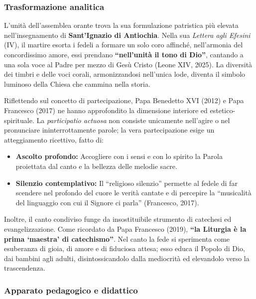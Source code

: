 \documentclass[12pt,a4paper]{article}
\begin{document}
	\subsubsection{Trasformazione analitica}\label{trasformazione-analitica-4}
	
	L'unità dell'assemblea orante trova la sua formulazione patristica più elevata nell'insegnamento di \textbf{Sant'Ignazio di Antiochia}. Nella sua \emph{Lettera agli Efesini} (IV), il martire esorta i fedeli a formare un solo coro affinché, nell'armonia del concordissimo amore, essi prendano \textbf{``nell'unità il tono di Dio''}, cantando a una sola voce al Padre per mezzo di Gesù Cristo (Leone XIV, 2025). La diversità dei timbri e delle voci corali, armonizzandosi nell'unica lode, diventa il simbolo luminoso della Chiesa che cammina nella storia.
	
	Riflettendo sul concetto di partecipazione, Papa Benedetto XVI (2012) e Papa Francesco (2017) ne hanno approfondito la dimensione interiore ed estetico-spirituale. La \emph{participatio actuosa} non consiste unicamente nell'agire o nel pronunciare ininterrottamente parole; la vera partecipazione esige un atteggiamento ricettivo, fatto di:
	
	\begin{itemize}[leftmargin=*]
		\item \textbf{Ascolto profondo:} Accogliere con i sensi e con lo spirito la Parola proiettata dal canto e la bellezza delle melodie sacre.
		\item \textbf{Silenzio contemplativo:} Il ``religioso silenzio'' permette al fedele di far scendere nel profondo del cuore le verità cantate e di percepire la ``musicalità del linguaggio con cui il Signore ci parla'' (Francesco, 2017).
	\end{itemize}
	
	Inoltre, il canto condiviso funge da insostituibile strumento di catechesi ed evangelizzazione. Come ricordato da Papa Francesco (2019), \textbf{``la Liturgia è la prima `maestra' di catechismo''}. Nel canto la fede si sperimenta come esuberanza di gioia, di amore e di fiduciosa attesa; esso educa il Popolo di Dio, dai bambini agli adulti, disintossicandolo dalla mediocrità ed elevandolo verso la trascendenza.
	
	\subsubsection{Apparato pedagogico e didattico}\label{apparato-pedagogico-e-didattico-4}
	
\end{document}
